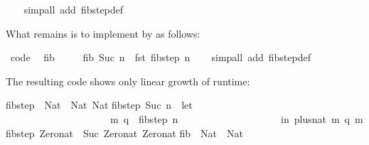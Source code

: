 \begin{isabellebody}
\ \ \isamarkupfalse%
\ {\isacharparenleft}simp{\isacharunderscore}all\ add{\isacharcolon}\ fib{\isacharunderscore}step{\isacharunderscore}def{\isacharparenright}%
\endisatagquote
{\isafoldquote}%
%
\isadelimquote
%
\endisadelimquote
%
\begin{isamarkuptext}%
\noindent What remains is to implement  by  as follows:%
\end{isamarkuptext}%
\isamarkuptrue%
%
\isadelimquote
%
\endisadelimquote
%
\isatagquote
{}\isamarkupfalse%
\ {\isacharbrackleft}code{\isacharbrackright}{\isacharcolon}\isanewline
\ \ {\isachardoublequoteopen}fib\ {}\ {\isacharequal}\ {}{\isachardoublequoteclose}\isanewline
\ \ {\isachardoublequoteopen}fib\ {\isacharparenleft}Suc\ n{\isacharparenright}\ {\isacharequal}\ fst\ {\isacharparenleft}fib{\isacharunderscore}step\ n{\isacharparenright}{\isachardoublequoteclose}\isanewline
\ \ \isamarkupfalse%
\ {\isacharparenleft}simp{\isacharunderscore}all\ add{\isacharcolon}\ fib{\isacharunderscore}step{\isacharunderscore}def{\isacharparenright}%
\endisatagquote
{\isafoldquote}%
%
\isadelimquote
%
\endisadelimquote
%
\begin{isamarkuptext}%
\noindent The resulting code shows only linear growth of runtime:%
\end{isamarkuptext}%
\isamarkuptrue%
%
\isadelimquotetypewriter
%
\endisadelimquotetypewriter
%
\isatagquotetypewriter
%
\begin{isamarkuptext}%
fib{\isacharunderscore}step\ {\isacharcolon}{\isacharcolon}\ Nat\ {\isacharminus}{\isachargreater}\ {\isacharparenleft}Nat{\isacharcomma}\ Nat{\isacharparenright}{\isacharsemicolon}\isanewline
fib{\isacharunderscore}step\ {\isacharparenleft}Suc\ n{\isacharparenright}\ {\isacharequal}\ let\ {\isacharbraceleft}\isanewline
\ \ \ \ \ \ \ \ \ \ \ \ \ \ \ \ \ \ \ \ \ {\isacharparenleft}m{\isacharcomma}\ q{\isacharparenright}\ {\isacharequal}\ fib{\isacharunderscore}step\ n{\isacharsemicolon}\isanewline
\ \ \ \ \ \ \ \ \ \ \ \ \ \ \ \ \ \ \ {\isacharbraceright}\ in\ {\isacharparenleft}plus{\isacharunderscore}nat\ m\ q{\isacharcomma}\ m{\isacharparenright}{\isacharsemicolon}\isanewline
fib{\isacharunderscore}step\ Zero{\isacharunderscore}nat\ {\isacharequal}\ {\isacharparenleft}Suc\ Zero{\isacharunderscore}nat{\isacharcomma}\ Zero{\isacharunderscore}nat{\isacharparenright}{\isacharsemicolon}\isanewline
\isanewline
fib\ {\isacharcolon}{\isacharcolon}\ Nat\ {\isacharminus}{\isachargreater}\ Nat{\isacharsemicolon}\isanewline

\end{isamarkuptext}
\end{isabellebody}
